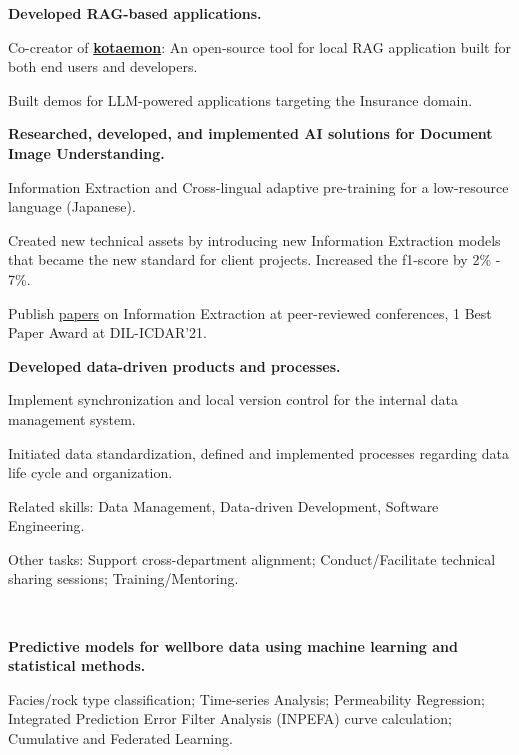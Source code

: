 \begin{xitemize}
    \item \textbf{Developed RAG-based applications.}
    \begin{zitemize}
        \item Co-creator of \href{https://github.com/Cinnamon/kotaemon}{\textbf{kotaemon}}: An
        open-source tool for local RAG application built for both end users and developers.
        \item Built demos for LLM-powered applications targeting the Insurance domain.
    \end{zitemize}
    \item \textbf{Researched, developed, and implemented AI solutions for Document Image Understanding.}
    \begin{zitemize}
        \item Information Extraction and Cross-lingual adaptive pre-training for a
        low-resource language (Japanese).
        \item Created new technical assets by introducing new Information Extraction models that
        became the new standard for client projects. Increased the f1-score by 2\% - 7\%.
        \item Publish \href{https://scholar.google.com/citations?user=\gscholarid}{papers} on
        Information Extraction at peer-reviewed conferences, 1 Best Paper Award
        at DIL-ICDAR'21.
    \end{zitemize}
    \item \textbf{Developed data-driven products and processes.}
    \begin{zitemize}
        \item Implement synchronization and local version control for the internal
        data management system.
        \item Initiated data standardization, defined and implemented processes regarding data life cycle and organization.
        \item Related skills: Data Management, Data-driven Development, Software Engineering.
    \end{zitemize}
    \item Other tasks: Support cross-department alignment; Conduct/Facilitate technical sharing sessions; Training/Mentoring.
\end{xitemize}

\\
\vspace{-.2em}
\begin{xitemize}
    \item \textbf{Predictive models for wellbore data using machine learning and statistical methods.}
    \begin{zitemize}
        \item Facies/rock type classification; Time-series Analysis; Permeability Regression; Integrated Prediction Error Filter Analysis (INPEFA) curve calculation; Cumulative and Federated Learning.
    \end{zitemize}
\end{xitemize}